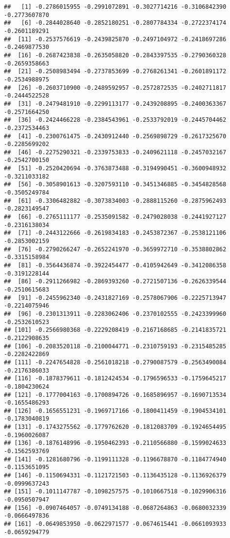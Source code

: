 \documentclass[
]{article}
\begin{document}
\begin{verbatim}
##   [1] -0.2786015955 -0.2991072891 -0.3027714216 -0.3106842390 -0.2773607870
##   [6] -0.2844028640 -0.2852180251 -0.2807784334 -0.2722374174 -0.2601189291
##  [11] -0.2537576619 -0.2439825870 -0.2497104972 -0.2418697286 -0.2469877530
##  [16] -0.2687423838 -0.2635058820 -0.2843397535 -0.2790360328 -0.2659358663
##  [21] -0.2508983494 -0.2737853699 -0.2768261341 -0.2601891172 -0.2534988975
##  [26] -0.2603710900 -0.2489592957 -0.2572872535 -0.2402711817 -0.2444522528
##  [31] -0.2479481910 -0.2299113177 -0.2439208895 -0.2400363367 -0.2571664250
##  [36] -0.2424466228 -0.2384543961 -0.2533792019 -0.2445704462 -0.2372534463
##  [41] -0.2300761475 -0.2430912440 -0.2569898729 -0.2617325670 -0.2285699202
##  [46] -0.2275290321 -0.2339753833 -0.2409621118 -0.2457032167 -0.2542700150
##  [51] -0.2520420694 -0.3763873488 -0.3194990451 -0.3600948932 -0.3211033182
##  [56] -0.3058901613 -0.3207593110 -0.3451346885 -0.3454828568 -0.3505249784
##  [61] -0.3306482882 -0.3073834003 -0.2888115260 -0.2875962493 -0.2823149547
##  [66] -0.2765111177 -0.2535091582 -0.2479028038 -0.2441927127 -0.2316138034
##  [71] -0.2443122666 -0.2619834183 -0.2453872367 -0.2538121106 -0.2853002159
##  [76] -0.2790266247 -0.2652241970 -0.3659972710 -0.3538802862 -0.3315158984
##  [81] -0.3564436874 -0.3922454477 -0.4105942649 -0.3412086358 -0.3191228144
##  [86] -0.2911266982 -0.2869393260 -0.2721507136 -0.2626339544 -0.2510615683
##  [91] -0.2455962340 -0.2431827169 -0.2578067906 -0.2225713947 -0.2214075946
##  [96] -0.2301313911 -0.2283062406 -0.2370102555 -0.2423399960 -0.2532610523
## [101] -0.2566980368 -0.2229208419 -0.2167168685 -0.2141835721 -0.2122908635
## [106] -0.2083520118 -0.2100044771 -0.2310759193 -0.2315485285 -0.2282422869
## [111] -0.2247654828 -0.2561018218 -0.2790087579 -0.2563490084 -0.2176386033
## [116] -0.1878379611 -0.1812424534 -0.1796596533 -0.1759645217 -0.1804230624
## [121] -0.1777004163 -0.1700894726 -0.1685896957 -0.1690713534 -0.1655486293
## [126] -0.1656551231 -0.1969717166 -0.1800411459 -0.1904534101 -0.1783040819
## [131] -0.1743275562 -0.1779762620 -0.1812083709 -0.1924654495 -0.1960026087
## [136] -0.1876148996 -0.1950462393 -0.2110566880 -0.1599024633 -0.1562593769
## [141] -0.1281680796 -0.1199111328 -0.1196678870 -0.1184774940 -0.1153651095
## [146] -0.1150694331 -0.1121721503 -0.1136435128 -0.1136926379 -0.0999637243
## [151] -0.1011147787 -0.1098257575 -0.1010667518 -0.1029906316 -0.0950507947
## [156] -0.0907464057 -0.0749134188 -0.0687264863 -0.0680032339 -0.0666497836
## [161] -0.0649853950 -0.0622971577 -0.0674615441 -0.0661093933 -0.0659294779

\end{verbatim}
\end{document}
